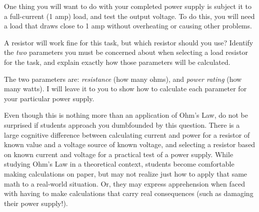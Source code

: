 

One thing you will want to do with your completed power supply is subject it to a full-current (1 amp) load, and test the output voltage.  To do this, you will need a load that draws close to 1 amp without overheating or causing other problems.  

A resistor will work fine for this task, but which resistor should you use?  Identify the {\it two} parameters you must be concerned about when selecting a load resistor for the task, and explain exactly how those parameters will be calculated.







The two parameters are: {\it resistance} (how many ohms), and {\it power rating} (how many watts).  I will leave it to you to show how to calculate each parameter for your particular power supply.







Even though this is nothing more than an application of Ohm's Law, do not be surprised if students approach you dumbfounded by this question.  There is a large cognitive difference between calculating current and power for a resistor of known value and a voltage source of known voltage, and selecting a resistor based on known current and voltage for a practical test of a power supply.  While studying Ohm's Law in a theoretical context, students become comfortable making calculations on paper, but may not realize just how to apply that same math to a real-world situation.  Or, they may express apprehension when faced with having to make calculations that carry real consequences (such as damaging their power supply!).



